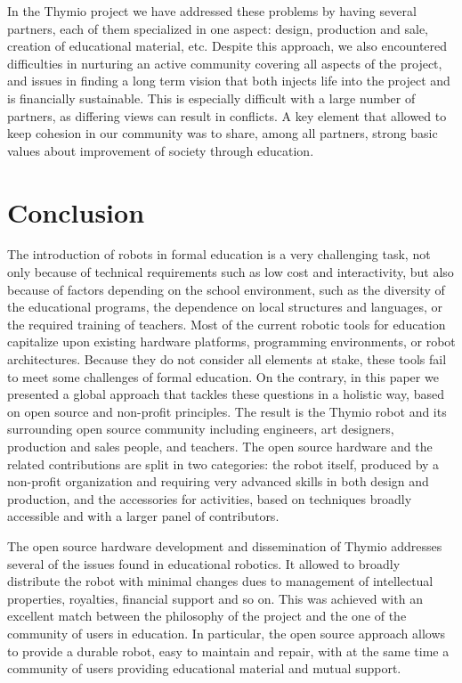 \documentclass[letterpaper, 10 pt, conference]{ieeeconf}  %
\begin{document}
In the Thymio project we have addressed these problems by having several partners, each of them specialized in one aspect: design, production and sale, creation of educational material, etc.
Despite this approach, we also encountered difficulties in nurturing an active community covering all aspects of the project, and issues in finding a long term vision that both injects life into the project and is financially sustainable.
This is especially difficult with a large number of partners, as differing views can result in conflicts. 
A key element that allowed to keep cohesion in our community was to share, among all partners, strong basic values about improvement of society through education.


\section{Conclusion}

The introduction of robots in formal education is a very challenging task, not only because of technical requirements such as low cost and interactivity, but also because of factors depending on the school environment, such as the diversity of the educational programs, the dependence on local structures and languages, or the required training of teachers.
Most of the current robotic tools for education capitalize upon existing hardware platforms, programming environments, or robot architectures.
Because they do not consider all elements at stake, these tools fail to meet some challenges of formal education.
On the contrary, in this paper we presented a global approach that tackles these questions in a holistic way, based on open source and non-profit principles.
The result is the Thymio robot and its surrounding open source community including engineers, art designers, production and sales people, and teachers.
The open source hardware and the related contributions are split in two categories: the robot itself, produced by a non-profit organization and requiring very advanced skills in both design and production, and the accessories for activities, based on techniques broadly accessible and with a larger panel of contributors.

The open source hardware development and dissemination of Thymio addresses several of the issues found in educational robotics.
It allowed to broadly distribute the robot with minimal changes dues to management of intellectual properties, royalties, financial support and so on.
This was achieved with an excellent match between the philosophy of the project and the one of the community of users in education.
In particular, the open source approach allows to provide a durable robot, easy to maintain and repair, with at the same time a community of users providing educational material and mutual support.
\end{document}
